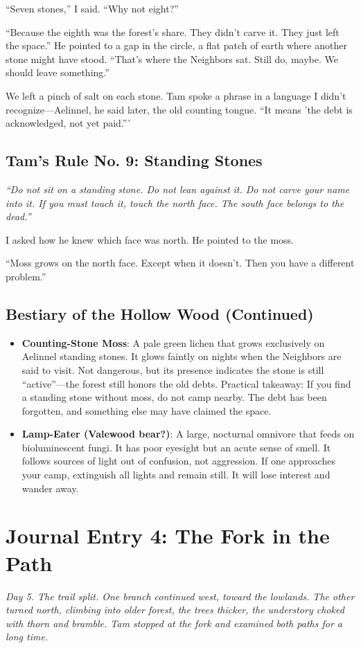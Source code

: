 \documentclass[11pt]{article}
\begin{document}
``Seven stones,'' I said. ``Why not eight?''

``Because the eighth was the forest's share. They didn't carve it. They just left the space.'' He pointed to a gap in the circle, a flat patch of earth where another stone might have stood. ``That's where the Neighbors sat. Still do, maybe. We should leave something.''

We left a pinch of salt on each stone. Tam spoke a phrase in a language I didn't recognize---Aelinnel, he said later, the old counting tongue. ``It means 'the debt is acknowledged, not yet paid.'''

\subsection*{Tam's Rule No. 9: Standing Stones}
\textit{``Do not sit on a standing stone. Do not lean against it. Do not carve your name into it. If you must touch it, touch the north face. The south face belongs to the dead.''}

I asked how he knew which face was north. He pointed to the moss.

``Moss grows on the north face. Except when it doesn't. Then you have a different problem.''

\subsection*{Bestiary of the Hollow Wood (Continued)}
\begin{itemize}
    \item \textbf{Counting-Stone Moss}: A pale green lichen that grows exclusively on Aelinnel standing stones. It glows faintly on nights when the Neighbors are said to visit. Not dangerous, but its presence indicates the stone is still ``active''---the forest still honors the old debts. Practical takeaway: If you find a standing stone without moss, do not camp nearby. The debt has been forgotten, and something else may have claimed the space.
    \item \textbf{Lamp-Eater (Valewood bear?)}: A large, nocturnal omnivore that feeds on bioluminescent fungi. It has poor eyesight but an acute sense of smell. It follows sources of light out of confusion, not aggression. If one approaches your camp, extinguish all lights and remain still. It will lose interest and wander away.
\end{itemize}

\section*{Journal Entry 4: The Fork in the Path}
\textit{Day 5. The trail split. One branch continued west, toward the lowlands. The other turned north, climbing into older forest, the trees thicker, the understory choked with thorn and bramble. Tam stopped at the fork and examined both paths for a long time.}
\end{document}
